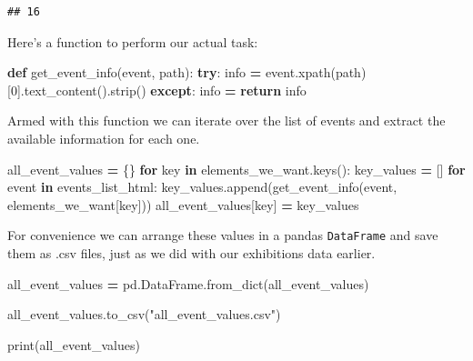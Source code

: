 \documentclass[
]{book}
\newenvironment{Shaded}{\begin{snugshade}}{\end{snugshade}}
\newcommand{\BuiltInTok}[1]{#1}
\newcommand{\ControlFlowTok}[1]{\textcolor[rgb]{0.13,0.29,0.53}{\textbf{#1}}}
\newcommand{\DecValTok}[1]{\textcolor[rgb]{0.00,0.00,0.81}{#1}}
\newcommand{\KeywordTok}[1]{\textcolor[rgb]{0.13,0.29,0.53}{\textbf{#1}}}
\newcommand{\NormalTok}[1]{#1}
\newcommand{\OperatorTok}[1]{\textcolor[rgb]{0.81,0.36,0.00}{\textbf{#1}}}
\newcommand{\StringTok}[1]{\textcolor[rgb]{0.31,0.60,0.02}{#1}}
\begin{document}
\begin{verbatim}
## 16
\end{verbatim}

Here's a function to perform our actual task:

\begin{Shaded}
\begin{Highlighting}[]
\KeywordTok{def}\NormalTok{ get\_event\_info(event, path):}
    \ControlFlowTok{try}\NormalTok{:}
\NormalTok{        info }\OperatorTok{=}\NormalTok{ event.xpath(path)[}\DecValTok{0}\NormalTok{].text\_content().strip()}
    \ControlFlowTok{except}\NormalTok{:}
\NormalTok{        info }\OperatorTok{=} \StringTok{\textquotesingle{}\textquotesingle{}}
    \ControlFlowTok{return}\NormalTok{ info}
\end{Highlighting}
\end{Shaded}

Armed with this function we can iterate over the list of events and extract the available information for each one.

\begin{Shaded}
\begin{Highlighting}[]
\NormalTok{all\_event\_values }\OperatorTok{=}\NormalTok{ \{\}}
\ControlFlowTok{for}\NormalTok{ key }\KeywordTok{in}\NormalTok{ elements\_we\_want.keys():}
\NormalTok{    key\_values }\OperatorTok{=}\NormalTok{ []}
    \ControlFlowTok{for}\NormalTok{ event }\KeywordTok{in}\NormalTok{ events\_list\_html: }
\NormalTok{        key\_values.append(get\_event\_info(event, elements\_we\_want[key]))}
\NormalTok{    all\_event\_values[key] }\OperatorTok{=}\NormalTok{ key\_values}
\end{Highlighting}
\end{Shaded}

For convenience we can arrange these values in a pandas \texttt{DataFrame} and save them as .csv files, just as we did with our exhibitions data earlier.

\begin{Shaded}
\begin{Highlighting}[]
\NormalTok{all\_event\_values }\OperatorTok{=}\NormalTok{ pd.DataFrame.from\_dict(all\_event\_values)}

\NormalTok{all\_event\_values.to\_csv(}\StringTok{"all\_event\_values.csv"}\NormalTok{)}

\BuiltInTok{print}\NormalTok{(all\_event\_values)}
\end{Highlighting}
\end{Shaded}
\end{document}
